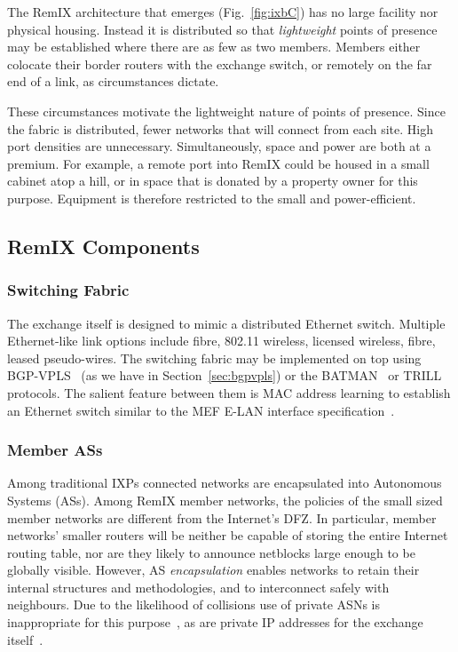 The RemIX architecture that emerges (Fig.~\ref{fig:ixbC})
has no large facility nor physical housing. Instead it is
distributed so that \emph{lightweight} points of presence may be established
where there are as few as two members. Members either colocate their border
routers with the exchange switch, or remotely on the far end of a link, as
circumstances dictate.

These circumstances motivate the lightweight nature of points of presence.
Since the fabric is distributed, fewer networks that will connect from each
site. High port densities are unnecessary. Simultaneously, space and power are
both at a premium. For example, a remote port into RemIX could be housed in a
small cabinet atop a hill, or in space that is donated by a property owner for
this purpose. Equipment is therefore restricted to the small and
power-efficient.


\subsection{RemIX Components}

\subsubsection{Switching Fabric}

The exchange itself is designed to mimic a distributed Ethernet switch. Multiple
Ethernet-like link options include fibre, 802.11 wireless, licensed wireless, fibre, leased pseudo-wires. The switching fabric may be implemented on
top using \acs{BGP}-\acs{VPLS}~\cite{rfc4761} (as we have in
Section~\ref{sec:bgpvpls}) or the
\acs{BATMAN}~\cite{johnson2008simple} or
\acs{TRILL}~\cite{perlman2004rbridges} protocols. The salient feature
between them is MAC address learning to establish an Ethernet switch
similar to the \ac{MEF} E-LAN interface
specification~\cite{mef62,mefes}.

\subsubsection{Member \acp{AS}}

Among traditional \acp{IXP} connected networks are encapsulated into
Autonomous Systems (\acp{AS}). Among RemIX member networks, the
policies of the small sized member networks are
different from the Internet's \ac{DFZ}. In particular, member
networks' smaller routers will be neither be capable of storing the
entire Internet routing table, nor are they likely to announce
netblocks large enough to be globally visible.  However, \ac{AS}
\emph{encapsulation} enables networks to retain their internal
structures and methodologies, and to interconnect safely  with
neighbours. Due to the likelihood of collisions use of private
\acp{ASN} is inappropriate for this purpose~\cite{rfc6996}, as are
private IP addresses for the exchange itself~\cite{rfc1918}.

